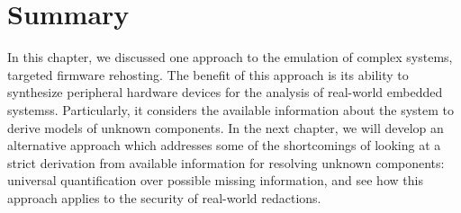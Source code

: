 \section{Summary}

In this chapter, we discussed one approach to the emulation of complex systems, targeted firmware rehosting.
The benefit of this approach is its ability to synthesize peripheral hardware devices for the analysis of real-world embedded systemss.
Particularly, it considers the available information about the system to derive models of unknown components.
In the next chapter, we will develop an alternative approach which addresses some of the shortcomings of looking at a strict derivation from available information for resolving unknown components: universal quantification over possible missing information, and see how this approach applies to the security of real-world redactions.
